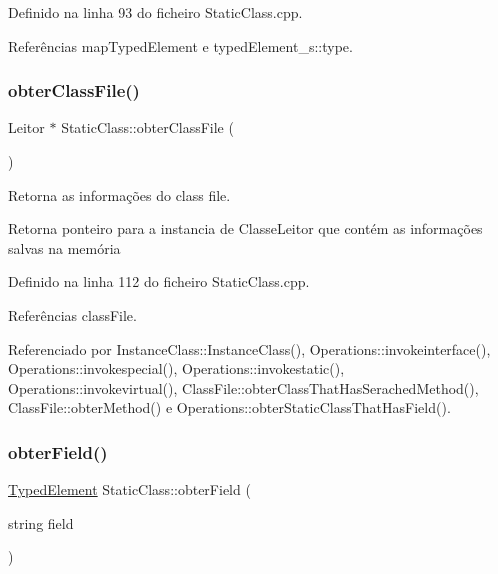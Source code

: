 Definido na linha 93 do ficheiro Static\+Class.\+cpp.



Referências map\+Typed\+Element e typed\+Element\+\_\+s\+::type.

\mbox{\label{classStaticClass_a49b4258a26420be4c6a1a79cdbdc2d5c}} 
\subsubsection{\texorpdfstring{obter\+Class\+File()}{obterClassFile()}}
{\footnotesize\ttfamily Leitor $\ast$ Static\+Class\+::obter\+Class\+File (\begin{DoxyParamCaption}{ }\end{DoxyParamCaption})}



Retorna as informações do class file. 

\begin{DoxyReturn}{Retorna}
ponteiro para a instancia de Classe\+Leitor que contém as informações salvas na memória 
\end{DoxyReturn}


Definido na linha 112 do ficheiro Static\+Class.\+cpp.



Referências class\+File.



Referenciado por Instance\+Class\+::\+Instance\+Class(), Operations\+::invokeinterface(), Operations\+::invokespecial(), Operations\+::invokestatic(), Operations\+::invokevirtual(), Class\+File\+::obter\+Class\+That\+Has\+Serached\+Method(), Class\+File\+::obter\+Method() e Operations\+::obter\+Static\+Class\+That\+Has\+Field().

\mbox{\label{classStaticClass_ac6d7d4b5b1c315623a8be477c66f38c3}} 
\subsubsection{\texorpdfstring{obter\+Field()}{obterField()}}
{\footnotesize\ttfamily \hyperlink{BasicTypes_8h_a97b332303b1262282599e6ede0637b82}{Typed\+Element} Static\+Class\+::obter\+Field (\begin{DoxyParamCaption}\item[{string}]{field }\end{DoxyParamCaption})}



